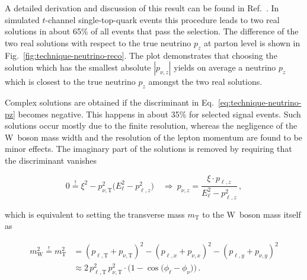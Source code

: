 A detailed derivation and discussion of this result can be found in Ref.~\cite{Chwalek:1416031}. In simulated $t$-channel single-top-quark events this procedure leads to two real solutions in about 65\% of all events that pass the selection. The difference of the two real solutions with respect to the true neutrino $p_{z}$ at parton level is shown in Fig.~\ref{fig:technique-neutrino-reco}. The plot demonstrates that choosing the solution which has the smallest absolute $|p_{\nu,z}|$ yields on average a neutrino $p_{z}$ which is closest to the true neutrino $p_{z}$ amongst the two real solutions.


Complex solutions are obtained if the discriminant in Eq.~\ref{eq:technique-neutrino-pz} becomes negative. This happens in about 35\% for selected signal events. Such solutions occur mostly due to the finite \met resolution, whereas the negligence of the W~boson mass width and the resolution of the lepton momentum are found to be minor effects. The imaginary part of the solutions is removed by requiring that the discriminant vanishes

\begin{equation}
0\overset{!}{=}\xi^2-p_{\nu,\mathrm{T}}^2\big(E_{\ell}^2-p_{\ell,z}^2\big)\quad
\Rightarrow~ p_{\nu,z}=\frac{\xi\cdot p_{\ell,z}}{E_{\ell}^{2}-p_{\ell,z}^{2}}\,,\label{eq:technique-pz-complex}
\end{equation}

which is equivalent to setting the transverse mass $m_\mathrm{T}$ to the W~boson mass itself as

\begin{align}
m_\mathrm{W}^2\overset{!}{=}m_\mathrm{T}^2&=(p_{\ell,\mathrm{T}}+p_{\nu,\mathrm{T}})^2-(p_{\ell,x}+p_{\nu,x})^{2}-(p_{\ell,y}+p_{\nu,y})^{2}\nonumber\\
&\approx2\,p_{\ell,\mathrm{T}}^2\,p_{\nu,\mathrm{T}}^2\cdot\Big(1-\cos\big(\phi_\ell-\phi_\nu\big)\Big)\,.
\end{align}

